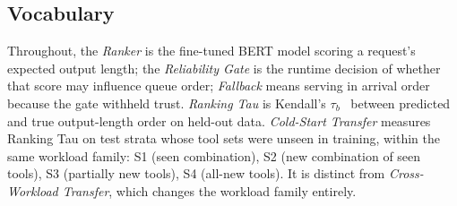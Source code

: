 \subsection{Vocabulary}
Throughout, the \emph{Ranker} is the fine-tuned BERT model scoring a
request's expected output length; the \emph{Reliability Gate} is the runtime
decision of whether that score may influence queue order; \emph{Fallback}
means serving in arrival order because the gate withheld trust.
\emph{Ranking Tau} is Kendall's $\tau_b$~\cite{kendall1938} between predicted and true
output-length order on held-out data. \emph{Cold-Start Transfer} measures
Ranking Tau on test strata whose tool sets were unseen in training, within
the same workload family: S1 (seen combination), S2 (new combination of seen
tools), S3 (partially new tools), S4 (all-new tools). It is distinct from
\emph{Cross-Workload Transfer}, which changes the workload family entirely.
